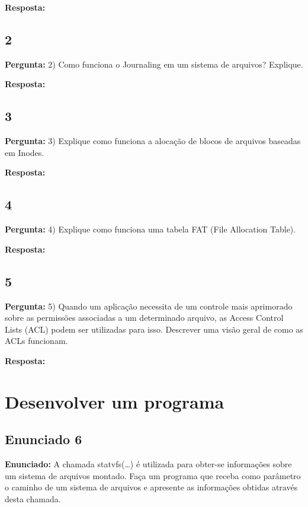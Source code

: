 \documentclass{article}
\begin{document}
\textbf{Resposta:}  

\subsection{2}

\textbf{Pergunta:} 2) Como funciona o Journaling em um sistema de arquivos? Explique.\newline

\textbf{Resposta:}  

\subsection{3}

\textbf{Pergunta:} 3) Explique como funciona a alocação de blocos de arquivos baseadas em Inodes.  \newline

\textbf{Resposta: }

\subsection{4}

\textbf{Pergunta:} 4) Explique como funciona uma tabela FAT (File Allocation Table). \newline

\textbf{Resposta:} 

\subsection{5}

\textbf{Pergunta:} 5) Quando um aplicação necessita de um controle mais aprimorado sobre as permissões associadas a um determinado arquivo, as Access Control Lists (ACL) podem ser utilizadas para isso. Descrever uma visão geral de como as ACLs funcionam.\newline

\textbf{Resposta:} 

\section{Desenvolver um programa}

\subsection{Enunciado 6}

\textbf{Enunciado:}  A chamada statvfs(…) é utilizada para obter-se informações sobre um sistema de arquivos montado. Faça um programa que receba como parâmetro o caminho de um sistema de arquivos e apresente as informações obtidas através desta chamada.\newline
\end{document}
